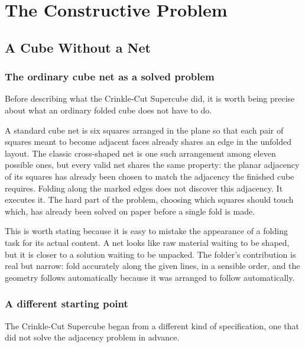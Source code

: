 \documentclass[11pt,oneside]{book}
\begin{document}
\part{The Constructive Problem}

\hypertarget{chapter-1.-a-cube-without-a-net}{%
\chapter{A Cube Without a
Net}\label{chapter-1.-a-cube-without-a-net}}

\hypertarget{the-ordinary-cube-net-as-a-solved-problem}{%
\section{The ordinary cube net as a solved
problem}\label{the-ordinary-cube-net-as-a-solved-problem}}

Before describing what the Crinkle-Cut Supercube did, it is worth being
precise about what an ordinary folded cube does not have to do.

A standard cube net is six squares arranged in the plane so that each
pair of squares meant to become adjacent faces already shares an edge in
the unfolded layout. The classic cross-shaped net is one such
arrangement among eleven possible ones, but every valid net shares the
same property: the planar adjacency of its squares has already been
chosen to match the adjacency the finished cube requires. Folding along
the marked edges does not discover this adjacency. It executes it. The
hard part of the problem, choosing which squares should touch which, has
already been solved on paper before a single fold is made.

This is worth stating because it is easy to mistake the appearance of a
folding task for its actual content. A net looks like raw material
waiting to be shaped, but it is closer to a solution waiting to be
unpacked. The folder's contribution is real but narrow: fold accurately
along the given lines, in a sensible order, and the geometry follows
automatically because it was arranged to follow automatically.

\hypertarget{a-different-starting-point}{%
\section{A different starting
point}\label{a-different-starting-point}}

The Crinkle-Cut Supercube began from a different kind of specification,
one that did not solve the adjacency problem in advance.
\end{document}

